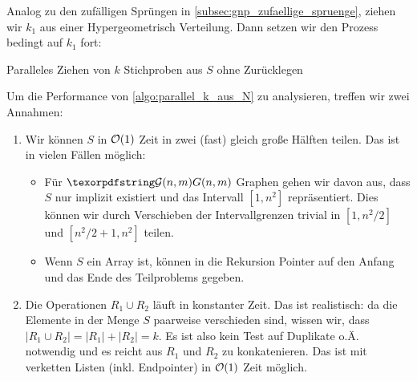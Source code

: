 Analog zu den zufälligen Sprüngen in \cref{subsec:gnp_zufaellige_spruenge}, ziehen wir $k_1$ aus einer Hypergeometrisch Verteilung.
Dann setzen wir den Prozess bedingt auf $k_1$ fort:

\begin{algorithm}
    \caption{Paralleles Ziehen von $k$ Stichproben aus $S$ ohne Zurücklegen}
    \label{algo:parallel_k_aus_N}
\end{algorithm}

\goodbreak

\noindent
Um die Performance von \cref{algo:parallel_k_aus_N} zu analysieren, treffen wir zwei Annahmen:
\begin{enumerate}
    \item Wir können $S$ in $\mathcal{O}\!\left(1\right)$ Zeit in zwei (fast) gleich große Hälften teilen.
          Das ist in vielen Fällen möglich:
          \begin{itemize}
              \item Für $\Gnm$ Graphen gehen wir davon aus, dass $S$ nur implizit existiert und das Intervall $[1, n^2]$ repräsentiert.
                    Dies können wir durch Verschieben der Intervallgrenzen trivial in $[1, n^2 / 2]$ und $[n^2/2 + 1, n^2]$ teilen.
              \item Wenn $S$ ein Array ist, können in die Rekursion Pointer auf den Anfang und das Ende des Teilproblems gegeben.
          \end{itemize}

    \item Die Operationen $R_1 \cup R_2$ läuft in konstanter Zeit.
          Das ist realistisch: da die Elemente in der Menge $S$ paarweise verschieden sind, wissen wir, dass $|R_1 \cup R_2| = |R_1| + |R_2| = k$.
          Es ist also kein Test auf Duplikate o.Ä. notwendig und es reicht aus $R_1$ und $R_2$ zu konkatenieren.
          Das ist mit verketten Listen (inkl. Endpointer) in $\mathcal{O}\!\left(1\right)$ Zeit möglich.
\end{enumerate}

